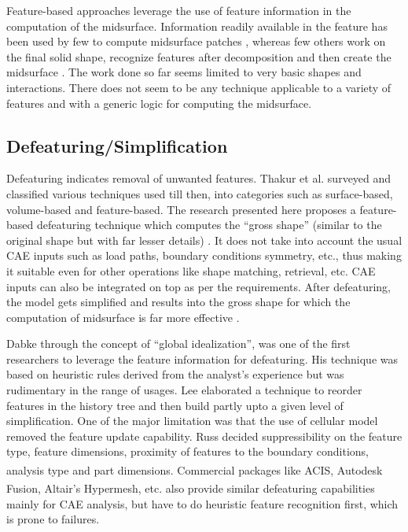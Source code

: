 Feature-based approaches leverage the use of feature information in the computation of the midsurface.  Information readily available in the feature has been used by few to compute midsurface patches \cite{Robinson2006, DengBrittonLamTorMa2002}, whereas few others work on the final solid shape, recognize features  after decomposition and then create the midsurface \cite{Chong2004, Boussuge2013, Boussuge2013a, Woo2013}. The work done so far seems limited to very basic shapes and interactions. There does not seem to be any technique applicable to a variety of features and with a generic logic for computing the midsurface.
 
 \subsection{Defeaturing/Simplification}
 
Defeaturing indicates removal of unwanted features.  Thakur et al. \cite{Thakur2009} surveyed and classified various techniques used till then, into categories such as surface-based, volume-based and feature-based.  The research presented  here proposes a feature-based defeaturing technique which computes the ``gross shape'' (similar to the original shape but with far lesser details) \cite{YogeshIITM2013}. It does not take into account the usual CAE inputs such as load paths, boundary conditions symmetry, etc., thus making it suitable even for other operations like shape matching, retrieval, etc. CAE inputs can also be integrated on top as per the requirements. After defeaturing, the model gets simplified and results into the gross shape for which the computation of midsurface is far more effective \cite{YogeshCADConf2015}.
 
Dabke \cite{Dabke1994} through the concept of ``global idealization'', was one of the first researchers to leverage the feature information for defeaturing. His technique was based on heuristic rules derived from the analyst's experience but was rudimentary in the range of usages. Lee \cite{Lee2005, SangHunLee2005, Lee2009} elaborated a technique to reorder features in the history tree and then build partly upto a given level of simplification. One of the major limitation was that the use of cellular model removed the feature update capability. Russ \cite{Russ2012} decided suppressibility on the feature type, feature dimensions, proximity of features to the boundary conditions, analysis type and part dimensions. Commercial packages like ACIS\textsuperscript{\textregistered}, Autodesk Fusion\textsuperscript{\textregistered}, Altair's Hypermesh\textsuperscript{\textregistered}, etc. also provide similar defeaturing capabilities mainly for CAE analysis, but have to do heuristic feature recognition first, which is prone to failures.
	
